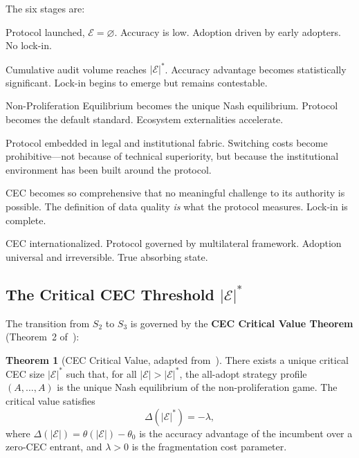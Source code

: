 \documentclass[12pt,a4paper]{article}
\theoremstyle{definition}
\newtheorem{theorem}{Theorem}[section]
\theoremstyle{remark}
\theoremstyle{definition}
\newcommand{\CEC}{\mathcal{E}}
\newcommand{\CECstar}{|\CEC|^*}
\begin{document}
The six stages are:

\begin{description}[nosep,leftmargin=2em]
  \item[$S_1$ --- Emergence (零散萌芽).] Protocol launched, $\CEC = \varnothing$. Accuracy is low. Adoption driven by early adopters. No lock-in.
  \item[$S_2$ --- Critical Mass (临界质量).] Cumulative audit volume reaches $\CECstar$. Accuracy advantage becomes statistically significant. Lock-in begins to emerge but remains contestable.
  \item[$S_3$ --- Moat Formation / NPE (护城河形成).] Non-Proliferation Equilibrium becomes the unique Nash equilibrium. Protocol becomes the default standard. Ecosystem externalities accelerate.
  \item[$S_4$ --- Institutionalization (制度化).] Protocol embedded in legal and institutional fabric. Switching costs become prohibitive---not because of technical superiority, but because the institutional environment has been built around the protocol.
  \item[$S_5$ --- Epistemic Closure (认知闭合).] CEC becomes so comprehensive that no meaningful challenge to its authority is possible. The definition of data quality \emph{is} what the protocol measures. Lock-in is complete.
  \item[$S_6$ --- Universal Harmony (天下大同).] CEC internationalized. Protocol governed by multilateral framework. Adoption universal and irreversible. True absorbing state.
\end{description}

\subsection{The Critical CEC Threshold $\CECstar$}

The transition from $S_2$ to $S_3$ is governed by the \textbf{CEC Critical Value Theorem} (Theorem~2 of~\cite{yajie_protocol}):

\begin{theorem}[CEC Critical Value, adapted from~\cite{yajie_protocol}]\label{thm:cec_critical}
  There exists a unique critical CEC size $\CECstar$ such that, for all $|\CEC| > \CECstar$, the all-adopt strategy profile $(A,\ldots,A)$ is the unique Nash equilibrium of the non-proliferation game. The critical value satisfies
  \begin{equation}\label{eq:cec_star}
    \Delta(\CECstar) = -\lambda,
  \end{equation}
  where $\Delta(|\CEC|) = \theta(|\CEC|) - \theta_0$ is the accuracy advantage of the incumbent over a zero-CEC entrant, and $\lambda > 0$ is the fragmentation cost parameter.
\end{theorem}
\end{document}

